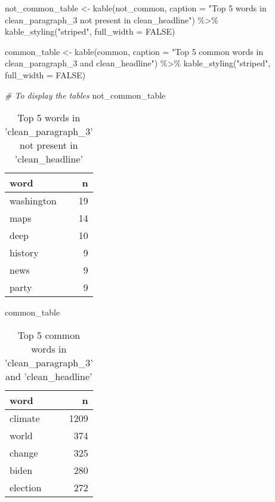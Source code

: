 \documentclass[
]{article}
\newenvironment{Shaded}{\begin{snugshade}}{\end{snugshade}}
\newcommand{\AttributeTok}[1]{\textcolor[rgb]{0.77,0.63,0.00}{#1}}
\newcommand{\CommentTok}[1]{\textcolor[rgb]{0.56,0.35,0.01}{\textit{#1}}}
\newcommand{\ConstantTok}[1]{\textcolor[rgb]{0.00,0.00,0.00}{#1}}
\newcommand{\FunctionTok}[1]{\textcolor[rgb]{0.00,0.00,0.00}{#1}}
\newcommand{\NormalTok}[1]{#1}
\newcommand{\OtherTok}[1]{\textcolor[rgb]{0.56,0.35,0.01}{#1}}
\newcommand{\SpecialCharTok}[1]{\textcolor[rgb]{0.00,0.00,0.00}{#1}}
\newcommand{\StringTok}[1]{\textcolor[rgb]{0.31,0.60,0.02}{#1}}
\begin{document}
\begin{Shaded}
\begin{Highlighting}[]
\NormalTok{not\_common\_table }\OtherTok{\textless{}{-}} \FunctionTok{kable}\NormalTok{(not\_common, }\AttributeTok{caption =} \StringTok{"Top 5 words in \textquotesingle{}clean\_paragraph\_3\textquotesingle{} not present in \textquotesingle{}clean\_headline\textquotesingle{}"}\NormalTok{) }\SpecialCharTok{\%\textgreater{}\%}
  \FunctionTok{kable\_styling}\NormalTok{(}\StringTok{"striped"}\NormalTok{, }\AttributeTok{full\_width =} \ConstantTok{FALSE}\NormalTok{)}

\NormalTok{common\_table }\OtherTok{\textless{}{-}} \FunctionTok{kable}\NormalTok{(common, }\AttributeTok{caption =} \StringTok{"Top 5 common words in \textquotesingle{}clean\_paragraph\_3\textquotesingle{} and \textquotesingle{}clean\_headline\textquotesingle{}"}\NormalTok{) }\SpecialCharTok{\%\textgreater{}\%}
  \FunctionTok{kable\_styling}\NormalTok{(}\StringTok{"striped"}\NormalTok{, }\AttributeTok{full\_width =} \ConstantTok{FALSE}\NormalTok{)}

\CommentTok{\# To display the tables}
\NormalTok{not\_common\_table}
\end{Highlighting}
\end{Shaded}

\begin{table}

\caption{\label{tab:unnamed-chunk-17}Top 5 words in 'clean_paragraph_3' not present in 'clean_headline'}
\centering
\begin{tabular}[t]{l|r}
\hline
word & n\\
\hline
washington & 19\\
\hline
maps & 14\\
\hline
deep & 10\\
\hline
history & 9\\
\hline
news & 9\\
\hline
party & 9\\
\hline
\end{tabular}
\end{table}

\begin{Shaded}
\begin{Highlighting}[]
\NormalTok{common\_table}
\end{Highlighting}
\end{Shaded}

\begin{table}

\caption{\label{tab:unnamed-chunk-17}Top 5 common words in 'clean_paragraph_3' and 'clean_headline'}
\centering
\begin{tabular}[t]{l|r}
\hline
word & n\\
\hline
climate & 1209\\
\hline
world & 374\\
\hline
change & 325\\
\hline
biden & 280\\
\hline
election & 272\\
\hline
\end{tabular}
\end{table}
\end{document}
